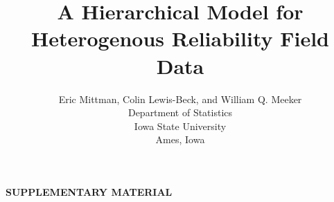 \documentclass[12pt]{article}
\begin{document}
{
  \title{\bf A Hierarchical Model for Heterogenous Reliability Field Data}
  \author{Eric Mittman, Colin Lewis-Beck, and William Q. Meeker\\
  Department of Statistics\\
  Iowa State University\\
  Ames, Iowa}
  \maketitle
} 

\def\spacingset#1{\renewcommand{\baselinestretch}%
{#1}\small\normalsize} \spacingset{1}

\begin{center}
{\large\bf SUPPLEMENTARY MATERIAL}
\end{center}

\newpage
\end{document}
